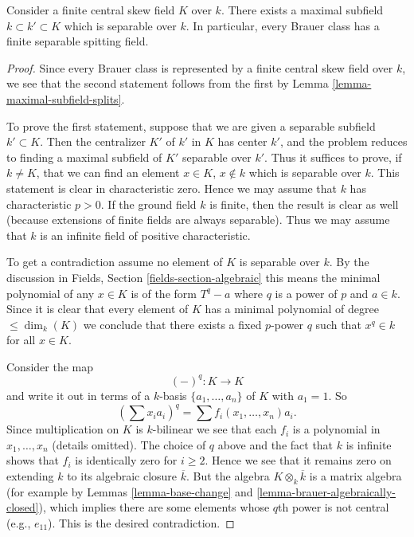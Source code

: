 \begin{proposition}
\label{proposition-separable-splitting-field}
Consider a finite central skew field $K$ over $k$.
There exists a maximal subfield $k \subset k' \subset K$ which
is separable over $k$.
In particular, every Brauer class has a finite separable
spitting field.
\end{proposition}

\begin{proof}
Since every Brauer class is represented by a finite central skew
field over $k$, we see that the second statement follows from the
first by
Lemma \ref{lemma-maximal-subfield-splits}.

\medskip\noindent
To prove the first statement, suppose that we are given a separable
subfield $k' \subset K$. Then the centralizer $K'$ of $k'$ in $K$
has center $k'$, and the problem reduces to finding a maximal
subfield of $K'$ separable over $k'$. Thus it suffices to prove, if
$k \not = K$, that we can find an element $x \in K$, $x \not \in k$
which is separable over $k$. This statement is clear in characteristic
zero. Hence we may assume that $k$ has characteristic $p > 0$. If the
ground field $k$ is finite, then the result is clear as well (because
extensions of finite fields are always separable). Thus we may assume
that $k$ is an infinite field of positive characteristic.

\medskip\noindent
To get a contradiction assume no element of $K$ is separable over $k$.
By the discussion in
Fields, Section \ref{fields-section-algebraic}
this means the minimal polynomial of any $x \in K$ is of the form
$T^q - a$ where $q$ is a power of $p$ and $a \in k$. Since it is
clear that every element of $K$ has a minimal polynomial of degree
$\leq \dim_k(K)$ we conclude that there exists a fixed $p$-power
$q$ such that $x^q \in k$ for all $x \in K$.

\medskip\noindent
Consider the map
$$
(-)^q : K \longrightarrow K
$$
and write it out in terms of a $k$-basis $\{a_1, \ldots, a_n\}$ of $K$
with $a_1 = 1$. So
$$
(\sum x_i a_i)^q = \sum f_i(x_1, \ldots, x_n)a_i.
$$
Since multiplication on $K$ is $k$-bilinear we see that each $f_i$
is a polynomial in $x_1, \ldots, x_n$ (details omitted).
The choice of $q$ above and the fact that $k$ is infinite shows that
$f_i$ is identically zero for $i \geq 2$. Hence we see that it remains
zero on extending $k$ to its algebraic closure $\overline{k}$. But the
algebra $K \otimes_k \overline{k}$ is a matrix algebra (for example by
Lemmas \ref{lemma-base-change} and \ref{lemma-brauer-algebraically-closed}),
which implies there are some elements whose $q$th power is not central
(e.g., $e_{11}$). This is the desired contradiction.
\end{proof}

